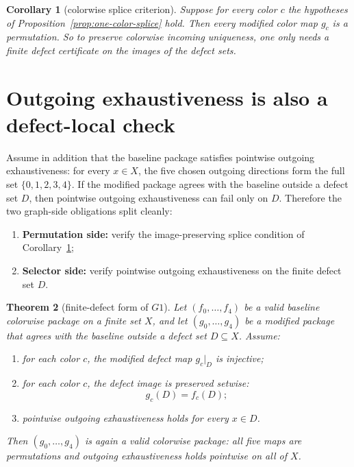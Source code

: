 \documentclass[11pt]{article}
\newtheorem{theorem}{Theorem}
\newtheorem{corollary}[theorem]{Corollary}
\begin{document}
\begin{corollary}[colorwise splice criterion]
\label{cor:colorwise-splice}
Suppose for every color \(c\) the hypotheses of
Proposition~\ref{prop:one-color-splice} hold.
Then every modified color map \(g_c\) is a permutation.
So to preserve colorwise incoming uniqueness, one only needs a finite defect
certificate on the images of the defect sets.
\end{corollary}

\section{Outgoing exhaustiveness is also a defect-local check}
Assume in addition that the baseline package satisfies pointwise outgoing
exhaustiveness:
for every \(x\in X\), the five chosen outgoing directions form the full set
\(\{0,1,2,3,4\}\).
If the modified package agrees with the baseline outside a defect set \(D\),
then pointwise outgoing exhaustiveness can fail only on \(D\).
Therefore the two graph-side obligations split cleanly:
\begin{enumerate}[label=\textup{(\arabic*)},leftmargin=2.8em]
\item \textbf{Permutation side:} verify the image-preserving splice condition of
      Corollary~\ref{cor:colorwise-splice};
\item \textbf{Selector side:} verify pointwise outgoing exhaustiveness on the
      finite defect set \(D\).
\end{enumerate}

\begin{theorem}[finite-defect form of \(G1\)]
\label{thm:G1-finite-defect}
Let \((f_0,\dots,f_4)\) be a valid baseline colorwise package on a finite set
\(X\), and let \((g_0,\dots,g_4)\) be a modified package that agrees with the
baseline outside a defect set \(D\subseteq X\).
Assume:
\begin{enumerate}[label=\textup{(\arabic*)},leftmargin=2.8em]
\item for each color \(c\), the modified defect map \(g_c\vert_D\) is injective;
\item for each color \(c\), the defect image is preserved setwise:
      \[
      g_c(D)=f_c(D);
      \]
\item pointwise outgoing exhaustiveness holds for every \(x\in D\).
\end{enumerate}
Then \((g_0,\dots,g_4)\) is again a valid colorwise package:
all five maps are permutations and outgoing exhaustiveness holds pointwise on
all of \(X\).
\end{theorem}
\end{document}
